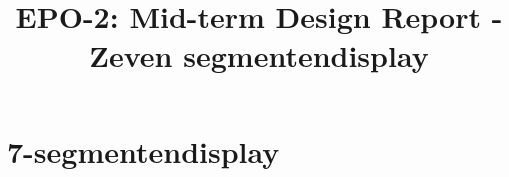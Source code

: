\documentclass{report}
\title{EPO-2: Mid-term Design Report - Zeven segmentendisplay}
\author{}
\begin{document}
\chapter{7-segmentendisplay}
\label{ch:sseg}
\end{document}
